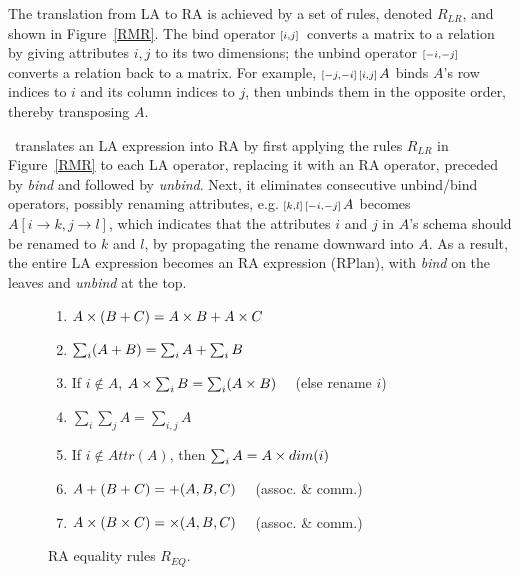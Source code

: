 The translation from LA to RA is achieved by a set of rules, denoted
$R_{LR}$, and shown in Figure~\ref{RMR}. The bind operator
${\scriptstyle\left[i,j\right]\,}$ converts a matrix to a relation by giving attributes
$i,j$ to its two dimensions; the unbind operator ${\scriptstyle\left[-i,-j\right]\,}$
converts a relation back to a matrix. For example,
${\scriptstyle\left[-j,-i\right]\,}{\scriptstyle\left[i,j\right]\,}A$ binds $A$'s row indices to $i$ and its
column indices to $j$, then unbinds them in the opposite order,
thereby transposing $A$.

\sys\ translates an LA expression into RA by first applying the
rules $R_{LR}$ in Figure~\ref{RMR} to each LA operator, replacing it
with an RA operator, preceded by {\em bind} and followed by {\em
  unbind}. Next, it eliminates consecutive unbind/bind operators,
possibly renaming attributes, e.g.  ${\scriptstyle\left[k,l\right]\,} {\scriptstyle\left[-i,-j\right]\,} A$
becomes $A[i \to k, j \to l]$, which indicates that the attributes $i$
and $j$ in $A$'s schema should be renamed to $k$ and $l$, by
propagating the rename downward into $A$.  As a result, the entire LA
expression becomes an RA expression (RPlan), with {\em bind}
on the leaves and {\em unbind} at the top.

\begin{figure}
\begin{enumerate}
\itemsep0em
  \item\label{RRC_mp} $A \times (B + C) = A \times B + A \times C$
  \item\label{RRC_ap} $\sum_i (A + B) = \sum_i A + \sum_i B$
  \item\label{RRC_ma} If $i \not\in A$, $A \times \sum_i B = \sum_i (A \times B)
    \quad$ (else rename $i$)
  \item\label{RRC_aa} $\sum_i \sum_j A = \sum_{i,j} A$
  \item\label{RRC_ac} If $i \not\in Attr(A)$, then $\sum_i A = A \times dim(i)$
  \item\label{RRC_pp} $A + (B + C) = +(A, B, C) \quad$ (assoc. \& comm.)
  \item\label{RRC_mm} $A \times (B \times C) = \times (A, B, C) \quad$ (assoc. \& comm.)
\end{enumerate}
\caption{RA equality rules $R_{EQ}$.}
\label{RRC}
\vspace*{3pt}
\end{figure}



